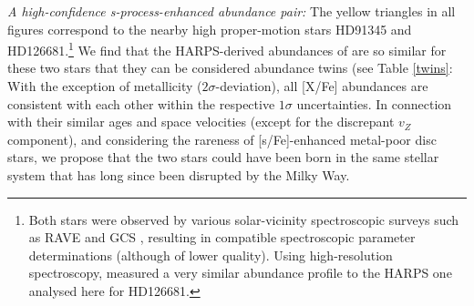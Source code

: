 \documentclass{aa}  %
\begin{document}
{\it A high-confidence s-process-enhanced abundance pair:} The yellow triangles in all figures correspond to the nearby high proper-motion stars HD91345 and HD126681.\footnote{Both stars were observed by various solar-vicinity spectroscopic surveys such as RAVE \citep{Steinmetz2006, Kunder2017} and GCS \citep{Nordstroem2004, Casagrande2011}, resulting in compatible spectroscopic parameter determinations (although of lower quality). Using high-resolution spectroscopy, \citet{Bensby2014} measured a very similar abundance profile  to the HARPS one analysed here for HD126681.} We find that the HARPS-derived abundances of \citet{DelgadoMena2017} are so similar for these two stars that they can be considered abundance twins (see Table \ref{twins}: With the exception of metallicity ($2\sigma$-deviation), all [X/Fe] abundances are consistent with each other within the respective $1\sigma$ uncertainties. In connection with their similar ages and space velocities (except for the discrepant $v_Z$ component), and considering the rareness of [s/Fe]-enhanced metal-poor disc stars, we propose that the two stars could have been born in the same stellar system that has long since been disrupted by the Milky Way.
\end{document}
